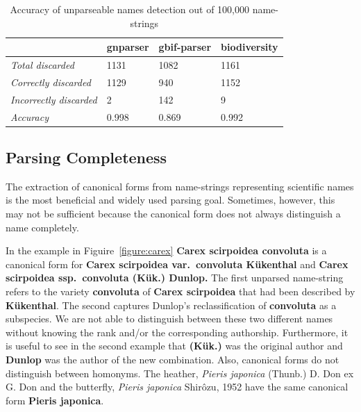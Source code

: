 \documentclass{bmcart}
\begin{document}
\begin{table}[htb]
  \begin{center}
    \caption{Accuracy of unparseable names detection out of 100,000
    name-strings}\label{table:unparsed}
    \resizebox{10cm}{!} {\begin{tabular}{| l | *{3}{l} |}
      \hline
                                     & gnparser & gbif-parser & biodiversity \\
      \hline
      \textit{Total discarded}       & 1131     & 1082        & 1161         \\
      \textit{Correctly discarded}   & 1129     & 940         & 1152         \\
      \textit{Incorrectly discarded} & 2        & 142         & 9            \\
      \textit{Accuracy}              & 0.998    & 0.869       & 0.992        \\
      \hline
    \end{tabular}
  }
  \end{center}
\end{table}

\subsection*{Parsing Completeness}

The extraction of canonical forms from name-strings representing scientific names is the most beneficial and widely used parsing goal. Sometimes, however, this may not be sufficient because the canonical form does not always distinguish a name completely.

In the example in Figuire~\ref{figure:carex} \textbf{Carex scirpoidea convoluta} is a canonical form for \textbf{Carex scirpoidea var.\ convoluta Kükenthal} and \textbf{Carex scirpoidea ssp.\ convoluta (Kük.) Dunlop.} The first unparsed name-string refers to the variety \textbf{convoluta} of \textbf{Carex scirpoidea} that had been described by \textbf{Kükenthal}. The second captures Dunlop's reclassification of \textbf{convoluta} as a subspecies. We are not able to distinguish between these two different names without knowing the rank and/or the corresponding authorship. Furthermore, it is useful to see in the second example that \textbf{(Kük.)} was the original author and \textbf{Dunlop} was the author of the new combination. Also, canonical forms do not distinguish between homonyms. The heather,  \textit{Pieris japonica} (Thunb.) D. Don ex G. Don and the butterfly, \textit{Pieris japonica} Shirôzu, 1952 have the same canonical form \textbf{Pieris japonica}.
\end{document}
